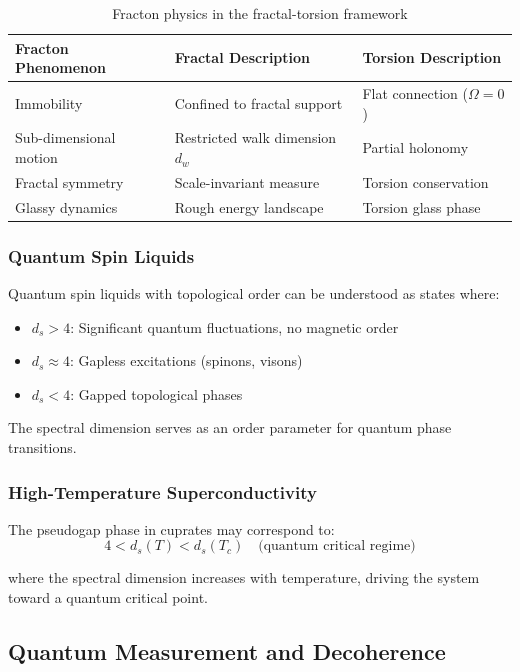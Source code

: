 \begin{table}[h]
\centering
\begin{tabular}{p{3.5cm}p{4cm}p{4cm}}
\toprule
\textbf{Fracton Phenomenon} & \textbf{Fractal Description} & \textbf{Torsion Description} \\
\midrule
Immobility & Confined to fractal support & Flat connection ($\Omega = 0$) \\
Sub-dimensional motion & Restricted walk dimension $d_w$ & Partial holonomy \\
Fractal symmetry & Scale-invariant measure & Torsion conservation \\
Glassy dynamics & Rough energy landscape & Torsion glass phase \\
\bottomrule
\end{tabular}
\caption{Fracton physics in the fractal-torsion framework}
\end{table}

\subsubsection{Quantum Spin Liquids}

Quantum spin liquids with topological order can be understood as states where:
\begin{itemize}
    \item $d_s > 4$: Significant quantum fluctuations, no magnetic order
    \item $d_s \approx 4$: Gapless excitations (spinons, visons)
    \item $d_s < 4$: Gapped topological phases
\end{itemize}

The spectral dimension serves as an order parameter for quantum phase transitions.

\subsubsection{High-Temperature Superconductivity}

The pseudogap phase in cuprates may correspond to:
\begin{equation}
    4 < d_s(T) < d_s(T_c) \quad \text{(quantum critical regime)}
\end{equation}

where the spectral dimension increases with temperature, driving the system toward a quantum critical point.

\subsection{Quantum Measurement and Decoherence}

